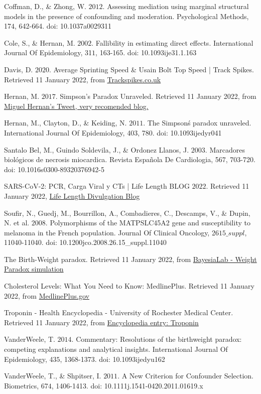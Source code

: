 \documentclass{article}
\begin{document}
Coffman, D., \& Zhong, W. \(2012\). Assessing mediation using marginal structural models in the presence of confounding and moderation. Psychological Methods, 17\(4\), 642-664. doi: 10.1037\/a0029311

Cole, S., \& Hernan, M. \(2002\). Fallibility in estimating direct effects. International Journal Of Epidemiology, 31\(1\), 163-165. doi: 10.1093\/ije\/31.1.163

Davis, D. \(2020\). Average Sprinting Speed \& Usain Bolt Top Speed | Track Spikes. Retrieved 11 January 2022, from \href{https://trackspikes.co.uk/average-sprinting-speed/#}{Trackspikes.co.uk}

Hernan, M. \(2017\). Simpson's Paradox Unraveled. Retrieved 11 January 2022, from \href{https://twitter.com/_MiguelHernan/status/860542619818106881?s=20}{Miguel Hernan's Tweet, very recomended blog.}

Hernan, M., Clayton, D., \& Keiding, N. \(2011\). The Simpson\'s paradox unraveled. International Journal Of Epidemiology, 40\(3\), 780. doi: 10.1093\/ije\/dyr041

Santalo Bel, M., Guindo Soldevila, J., \& Ordonez Llanos, J. \(2003\). Marcadores biológicos de necrosis miocardica. Revista Española De Cardiologia, 56\(7\), 703-720. doi: 10.1016\/s0300-8932\(03\)76942-5

SARS-CoV-2: PCR, Carga Viral y CTs | Life Length BLOG \(2022\). Retrieved 11 January 2022, \href{from https://lifelength.com/es/sars-cov-2-pcr-carga-viral-y-cts/}{Life Length Divulgation Blog}

Soufir, N., Guedj, M., Bourrillon, A., Combadieres, C., Descamps, V., \& Dupin, N. et al. \(2008\). Polymorphisms of the MATP\/SLC45A2 gene and susceptibility to melanoma in the French population. Journal Of Clinical Oncology, 26\(15\_suppl\), 11040-11040. doi: 10.1200\/jco.2008.26.15\_suppl.11040

The Birth-Weight paradox. Retrieved 11 January 2022, from \href{https://library.bayesia.com/articles/#!bayesialab-knowledge-hub/the-birth-weight-paradox}{BayesiaLab - Weight Paradox simulation}

Cholesterol Levels: What You Need to Know: MedlinePlus. Retrieved 11 January 2022, from \href{https://medlineplus.gov/cholesterollevelswhatyouneedtoknow.html}{MedlinePlus.gov}

Troponin - Health Encyclopedia - University of Rochester Medical Center. Retrieved 11 January 2022, from \href{https://www.urmc.rochester.edu/encyclopedia/content.aspx?contenttypeid=167&contentid=troponin}{Encyclopedia entry: Troponin}

VanderWeele, T. \(2014\). Commentary: Resolutions of the birthweight paradox: competing explanations and analytical insights. International Journal Of Epidemiology, 43\(5\), 1368-1373. doi: 10.1093\/ije\/dyu162

VanderWeele, T., \& Shpitser, I. \(2011\). A New Criterion for Confounder Selection. Biometrics, 67\(4\), 1406-1413. doi: 10.1111\/j.1541-0420.2011.01619.x
\end{document}
